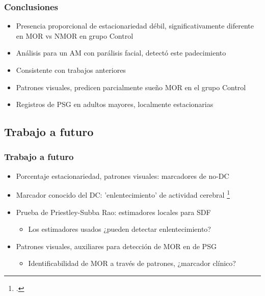 \documentclass{beamer}
\begin{document}
\begin{frame}\frametitle{Conclusiones}
\begin{itemize}
\item Presencia proporcional de estacionariedad d\'ebil, significativamente diferente en MOR vs 
NMOR en grupo Control

\item An\'alisis para un AM con par\'alisis facial, detect\'o este padecimiento

\item Consistente con trabajos anteriores %

\item Patrones visuales, predicen parcialmente sue\~no MOR en el grupo Control

\item Registros de PSG en adultos mayores, localmente estacionarias
\end{itemize}
\end{frame}


\subsection{Trabajo a futuro}

\begin{frame}\frametitle{Trabajo a futuro}
\begin{itemize}
\item Porcentaje estacionariedad, patrones visuales: marcadores de no-DC

\item Marcador conocido del DC: 'enlentecimiento' de actividad cerebral \footcite{Becerra12} 

\item Prueba de Priestley-Subba Rao: estimadores locales para SDF
\begin{itemize}
\item  Los estimadores usados ¿pueden detectar enlentecimiento?
\end{itemize}

\item Patrones visuales, auxiliares para detecci\'on de MOR en de PSG
\begin{itemize}
\item Identificabilidad de MOR a trav\'es de patrones, ¿marcador cl\'inico?
\end{itemize}
\end{itemize}
\end{frame}
\end{document}
